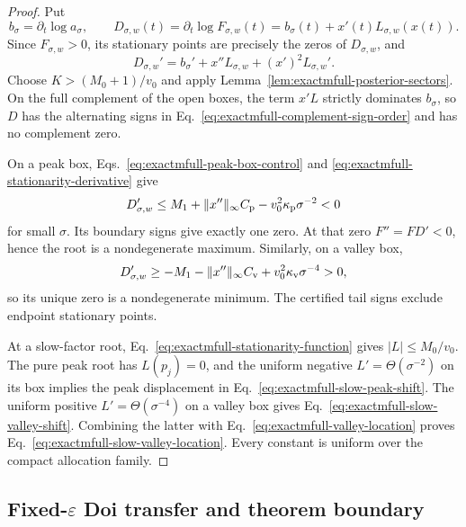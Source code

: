 \begin{proof}
Put
\begin{equation}
 b_\sigma=\partial_t\log a_\sigma,
 \qquad
 D_{\sigma,w}(t)=\partial_t\log F_{\sigma,w}(t)
 =b_\sigma(t)+x'(t)L_{\sigma,w}(x(t)).
 \label{eq:exactmfull-stationarity-function}
\end{equation}
Since \(F_{\sigma,w}>0\), its stationary points are precisely the zeros of
\(D_{\sigma,w}\), and
\begin{equation}
 D_{\sigma,w}'
 =b_\sigma'+x''L_{\sigma,w}+(x')^2L_{\sigma,w}'.
 \label{eq:exactmfull-stationarity-derivative}
\end{equation}
Choose \(K>(M_0+1)/v_0\) and apply
Lemma~\ref{lem:exactmfull-posterior-sectors}.  On the full complement of the
open boxes, the term \(x'L\) strictly dominates \(b_\sigma\), so \(D\) has
the alternating signs in Eq.~\eqref{eq:exactmfull-complement-sign-order} and
has no complement zero.

On a peak box, Eqs.~\eqref{eq:exactmfull-peak-box-control} and
\eqref{eq:exactmfull-stationarity-derivative} give
\begin{equation}
 D_{\sigma,w}'
 \le M_1+\|x''\|_\infty C_{\rm p}
 -v_0^2\kappa_{\rm p}\sigma^{-2}<0
 \label{eq:exactmfull-peak-root-monotonicity}
\end{equation}
for small \(\sigma\).  Its boundary signs give exactly one zero.  At that
zero \(F''=FD'<0\), hence the root is a nondegenerate maximum.  Similarly,
on a valley box,
\begin{equation}
 D_{\sigma,w}'
 \ge-M_1-\|x''\|_\infty C_{\rm v}
 +v_0^2\kappa_{\rm v}\sigma^{-4}>0,
 \label{eq:exactmfull-valley-root-monotonicity}
\end{equation}
so its unique zero is a nondegenerate minimum.  The certified tail signs
exclude endpoint stationary points.

At a slow-factor root, Eq.~\eqref{eq:exactmfull-stationarity-function} gives
\(|L|\le M_0/v_0\).  The pure peak root has \(L(p_j)=0\), and the uniform
negative \(L'=\Theta(\sigma^{-2})\) on its box implies the peak displacement
in Eq.~\eqref{eq:exactmfull-slow-peak-shift}.  The uniform positive
\(L'=\Theta(\sigma^{-4})\) on a valley box gives
Eq.~\eqref{eq:exactmfull-slow-valley-shift}.  Combining the latter with
Eq.~\eqref{eq:exactmfull-valley-location} proves
Eq.~\eqref{eq:exactmfull-slow-valley-location}.  Every constant is uniform
over the compact allocation family.
\end{proof}

\subsection{Fixed-\texorpdfstring{\(\varepsilon\)}{epsilon} Doi transfer and
theorem boundary}
\label{subsec:exactmfull-doi-transfer}

